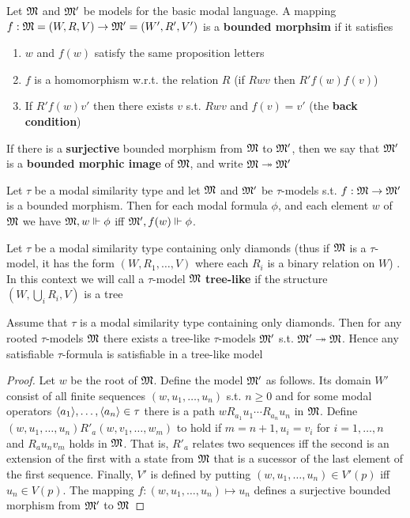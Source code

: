 \documentclass[11pt]{article}
\begin{document}
\begin{definition}
Let \(\mathfrak{M}\) and \(\mathfrak{M}'\) be models for the basic modal language. A mapping
\(f:\mathfrak{M}=(W,R,V)\to\mathfrak{M}'=(W',R',V')\) is a \textbf{bounded morphsim} if it satisfies
\begin{enumerate}
\item \(w\) and \(f(w)\) satisfy the same proposition letters
\item \(f\) is a homomorphism w.r.t. the relation \(R\) (if \(Rwv\) then \(R'f(w)f(v)\))
\item If \(R'f(w)v'\) then there exists \(v\) s.t. \(Rwv\) and \(f(v)=v'\) (the
\textbf{back condition})
\end{enumerate}


If there is a \textbf{surjective} bounded morphism from \(\mathfrak{M}\) to \(\mathfrak{M}'\), then we
say that \(\mathfrak{M}'\) is a \textbf{bounded morphic image} of \(\mathfrak{M}\), and write
\(\mathfrak{M}\twoheadrightarrow\mathfrak{M}'\)
\end{definition}

\begin{proposition}[]
Let \(\tau\) be a modal similarity type and let \(\mathfrak{M}\) and \(\mathfrak{M}'\) be
\(\tau\)-models s.t. \(f:\mathfrak{M}\to\mathfrak{M}'\) is a bounded morphism. Then for each
modal formula \(\phi\), and each element \(w\) of \(\mathfrak{M}\) we have
\(\mathfrak{M},w\Vdash\phi\) iff \(\mathfrak{M}',f(w)\Vdash\phi\).
\end{proposition}


Let \(\tau\) be a modal similarity type containing only diamonds (thus if \(\mathfrak{M}\)
is a \(\tau\)-model, it has the form \((W,R_1,\dots,V)\) where each \(R_i\)
is a binary relation on \(W\)) . In this context we will call a
\(\tau\)-model \(\mathfrak{M}\) \textbf{tree-like} if the structure \((W,\bigcup_i R_i,V)\) is
a tree

\begin{proposition}[]
\label{prop2.15}
Assume that \(\tau\) is a modal similarity type containing only diamonds. Then for
any rooted \(\tau\)-models \(\mathfrak{M}\) there exists a tree-like \(\tau\)-models
\(\mathfrak{M}'\) s.t. \(\mathfrak{M}'\twoheadrightarrow\mathfrak{M}\). Hence any satisfiable
\(\tau\)-formula is satisfiable in a tree-like model
\end{proposition}

\begin{proof}
Let \(w\) be the root of \(\mathfrak{M}\). Define the model \(\mathfrak{M}'\) as follows. Its
domain \(W'\) consist of all finite sequences \((w,u_1,\dots,u_n)\) s.t.
\(n\ge0\) and for some modal operators \(\langle a_1\rangle,\dots,\langle
    a_n\rangle\in\tau\) there is a path \(wR_{a_1}u_1\cdots R_{a_n}u_n\) in \(\mathfrak{M}\).
Define \((w,u_1,\dots,u_n)R'_a(w,v_1,\dots,w_m)\) to hold if
\(m=n+1,u_i=v_i\) for \(i=1,\dots,n\) and \(R_au_nv_m\) holds in \(\mathfrak{M}\).
That is, \(R'_a\) relates two sequences iff the second is an extension of
the first with a state from \(\mathfrak{M}\) that is a sucessor of the last element
of the first sequence. Finally, \(V'\) is defined by putting
\((w,u_1,\dots,u_n)\in V'(p)\) iff \(u_n\in V(p)\). The mapping
\(f:(w,u_1,\dots,u_n)\mapsto u_n\) defines a surjective bounded morphism
from \(\mathfrak{M}'\) to \(\mathfrak{M}\)
\end{proof}
\end{document}
